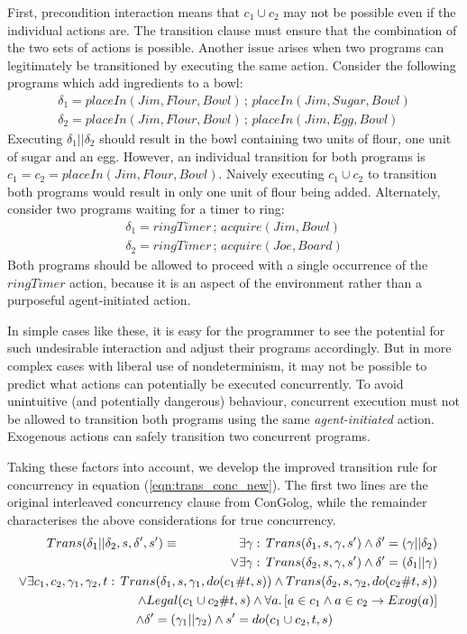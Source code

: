 First, precondition interaction means that $c_{1}\cup c_{2}$ may
not be possible even if the individual actions are. The transition
clause must ensure that the combination of the two sets of actions
is possible. Another issue arises when two programs can legitimately
be transitioned by executing the same action. Consider the following
programs which add ingredients to a bowl:\begin{gather*}
\delta_{1}=placeIn(Jim,Flour,Bowl)\,;\, placeIn(Jim,Sugar,Bowl)\\
\delta_{2}=placeIn(Jim,Flour,Bowl)\,;\, placeIn(Jim,Egg,Bowl)\end{gather*}
 Executing $\delta_{1}||\delta_{2}$ should result in the bowl containing
two units of flour, one unit of sugar and an egg. However, an individual
transition for both programs is $c_{1}=c_{2}=placeIn(Jim,Flour,Bowl)$.
Naively executing $c_{1}\cup c_{2}$ to transition both programs would
result in only one unit of flour being added. Alternately, consider
two programs waiting for a timer to ring:\begin{gather*}
\delta_{1}=ringTimer\,;\, acquire(Jim,Bowl)\\
\delta_{2}=ringTimer\,;\, acquire(Joe,Board)\end{gather*}
 Both programs should be allowed to proceed with a single occurrence
of the $ringTimer$ action, because it is an aspect of the environment
rather than a purposeful agent-initiated action.

In simple cases like these, it is easy for the programmer to see the
potential for such undesirable interaction and adjust their programs
accordingly. But in more complex cases with liberal use of nondeterminism,
it may not be possible to predict what actions can potentially be
executed concurrently. To avoid unintuitive (and potentially dangerous)
behaviour, concurrent execution must not be allowed to transition
both programs using the same \emph{agent-initiated} action. Exogenous
actions can safely transition two concurrent programs.

Taking these factors into account, we develop the improved transition
rule for concurrency in equation (\ref{eqn:trans_conc_new}). The
first two lines are the original interleaved concurrency clause from
ConGolog, while the remainder characterises the above considerations
for true concurrency.\begin{multline}
Trans(\delta_{1}||\delta_{2},s,\delta',s')\equiv\,\,\,\,\,\,\,\,\,\,\,\,\,\,\,\,\,\,\,\,\,\,\,\,\,\,\,\,\shoveright{\exists\gamma:\, Trans(\delta_{1},s,\gamma,s')\wedge\delta'=(\gamma||\delta_{2})}\\
\shoveright{\vee\exists\gamma:\, Trans(\delta_{2},s,\gamma,s')\wedge\delta'=(\delta_{1}||\gamma)}\\
\shoveright{\vee\exists c_{1},c_{2},\gamma_{1},\gamma_{2},t:\, Trans(\delta_{1},s,\gamma_{1},do(c_{1}\#t,s))\wedge Trans(\delta_{2},s,\gamma_{2},do(c_{2}\#t,s))}\\
\shoveright{\wedge Legal(c_{1}\cup c_{2}\#t,s)\wedge\forall a.\left[a\in c_{1}\wedge a\in c_{2}\rightarrow Exog(a)\right]}\\
\wedge\delta'=(\gamma_{1}||\gamma_{2})\wedge s'=do(c_{1}\cup c_{2},t,s)\label{eqn:trans_conc_new}\end{multline}


